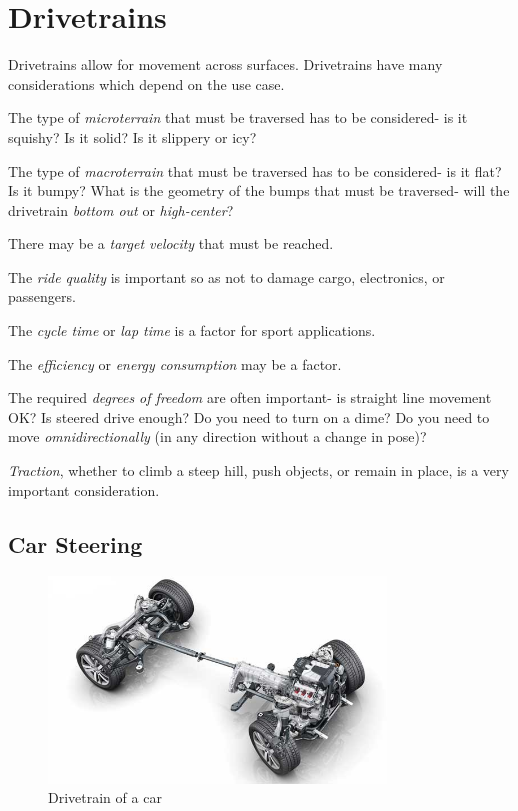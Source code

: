 \section{Drivetrains} \label{sec:drivetrains}
Drivetrains allow for movement across surfaces. Drivetrains have many considerations which depend on the use case.
\begin{asparaenum}[a)]
\item The type of \textit{microterrain} that must be traversed has to be considered- is it squishy? Is it solid? Is it slippery or icy? 
\item The type of \textit{macroterrain} that must be traversed has to be considered- is it flat? Is it bumpy? What is the geometry of the bumps that must be traversed- will the drivetrain \textit{bottom out} or \textit{high-center}?
\item There may be a \textit{target velocity} that must be reached.
\item The \textit{ride quality} is important so as not to damage cargo, electronics, or passengers.
\item The \textit{cycle time} or \textit{lap time} is a factor for sport applications.
\item The \textit{efficiency} or \textit{energy consumption} may be a factor.
\item The required \textit{degrees of freedom} are often important- is straight line movement OK? Is steered drive enough? Do you need to turn on a dime? Do you need to move \textit{omnidirectionally} (in any direction without a change in pose)?
\item \textit{Traction}, whether to climb a steep hill, push objects, or remain in place, is a very important consideration.
\end{asparaenum}
\subsection{Car Steering}
\begin{figure}[H]
	\includegraphics[width=0.8\textwidth]{imgs/drivetrain_car.jpeg}
	\caption{Drivetrain of a car}
\end{figure}


